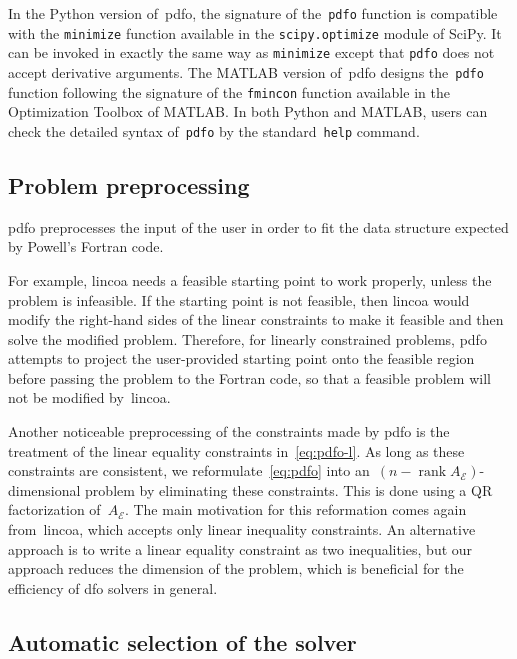 \documentclass[
    smallextended,  %
    final,          %
]{svjour3}
\DeclareMathOperator\rank{rank}
\newcommand{\aeq}{A_{\scriptscriptstyle\mathcal{E}}}
\newcommand{\pdfofun}{\texttt{pdfo}\xspace}
\begin{document}
In the Python version of~\gls{pdfo}, the signature of the~\pdfofun function is compatible with
the \texttt{minimize} function available in the \texttt{scipy.optimize} module of
SciPy. It can be invoked in exactly
the same way as \texttt{minimize} except that \pdfofun does not accept derivative arguments.
The MATLAB version of~\gls{pdfo} designs the~\pdfofun function following the signature of
the \texttt{fmincon} function available in the Optimization Toolbox of MATLAB.
In both Python and MATLAB, users can check the detailed syntax of~\pdfofun by the
standard~\texttt{help} command.


\subsection{Problem preprocessing}
\label{subsec:pdfo-preprocessing}

\gls{pdfo} preprocesses the input of the user in order to fit the data structure expected by
Powell's Fortran code.

For example, \gls{lincoa} needs a feasible starting point to work properly, unless the problem is
infeasible. If the starting point is not feasible, then \gls{lincoa} would modify the right-hand
sides of the linear constraints to make it feasible and then solve the modified problem.
Therefore, for linearly constrained problems, \gls{pdfo} attempts to project the user-provided
starting point onto the feasible region before passing the problem to the Fortran code, so that
a feasible problem will not be modified by~\gls{lincoa}.

Another noticeable preprocessing of the constraints made by \gls{pdfo} is the treatment of the
linear equality constraints in~\eqref{eq:pdfo-l}.
As long as these constraints are consistent, we reformulate~\eqref{eq:pdfo} into
an~$(n - \rank \aeq)$-dimensional problem by eliminating these constraints.  This is done using a
QR factorization of~$\aeq$. The main motivation for this reformation comes again from~\gls{lincoa},
which accepts only linear inequality constraints. An alternative approach is to write a linear
equality constraint as two inequalities, but our approach reduces the dimension of the problem,
which is beneficial for the efficiency of \gls{dfo} solvers in general.


\subsection{Automatic selection of the solver}
\label{subsec:solver-selection}
\end{document}
